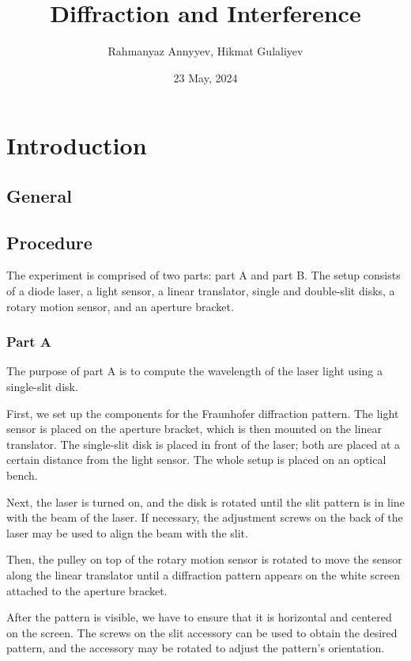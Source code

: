 \documentclass[10pt]{article}
\title{Diffraction and Interference}
\author{Rahmanyaz Annyyev, Hikmat Gulaliyev}
\date{23 May, 2024}
\begin{document}
\maketitle

\begin{abstract}

\end{abstract}

\section{Introduction}

\subsection*{General}

\subsection*{Procedure} 

The experiment is comprised of two parts: part A and part B. The setup consists of a diode laser, a light sensor, a linear translator, single and double-slit disks, a rotary motion sensor, and an aperture bracket.

\subsubsection*{Part A}

The purpose of part A is to compute the wavelength of the laser light using a single-slit disk.

First, we set up the components for the Fraunhofer diffraction pattern. The light sensor is placed on the aperture bracket, which is then mounted on the linear translator. The single-slit disk is placed in front of the laser; both are placed at a certain distance from the light sensor. The whole setup is placed on an optical bench.

Next, the laser is turned on, and the disk is rotated until the slit pattern is in line with the beam of the laser. If necessary, the adjustment screws on the back of the laser may be used to align the beam with the slit. 

Then, the pulley on top of the rotary motion sensor is rotated to move the sensor along the linear translator until a diffraction pattern appears on the white screen attached to the aperture bracket. 

After the pattern is visible, we have to ensure that it is horizontal and centered on the screen. The screws on the slit accessory can be used to obtain the desired pattern, and the accessory may be rotated to adjust the pattern's orientation.
\end{document}
